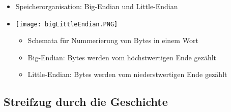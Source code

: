 \begin{itemize}
\begin{itemize}
                \item Speicherorganisation: Big-Endian und Little-Endian 
                \item[]
                    \begin{minipage}{0.2\textwidth}
                    \texttt{[image: bigLittleEndian.PNG]}
                    \end{minipage}
                    \begin{minipage}[t]{0.7\textwidth}
                    \vspace{-1.2cm}
                        \begin{itemize}
                            \item Schemata für Nummerierung von Bytes in einem Wort
                            \item Big-Endian: Bytes werden vom höchstwertigen Ende gezählt
                            \item Little-Endian: Bytes werden vom niederstwertigen Ende gezählt
                        \end{itemize}
                    \end{minipage}
            \end{itemize}
            
    \end{itemize}

\subsection{Streifzug durch die Geschichte}

